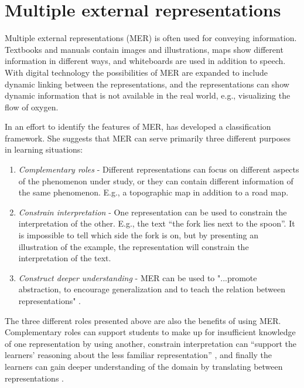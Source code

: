 
\section{Multiple external representations}
Multiple external representations (MER) is often used for conveying information. Textbooks and manuals contain images and illustrations, maps show different information in different ways, and whiteboards are used in addition to speech. With digital technology the possibilities of MER are expanded to include dynamic linking between the representations, and the representations can show dynamic information that is not available in the real world, e.g., visualizing the flow of oxygen. 

In an effort to identify the features of MER, \citet{ainsworth1999functions} has developed a classification framework. She suggests that MER can serve primarily three different purposes in learning situations:
\begin{enumerate}
\item{} \emph{Complementary roles} - Different representations can focus on different aspects of the phenomenon under study, or they can contain different information of the same phenomenon. E.g., a topographic map in addition to a road map. 
\item{} \emph{Constrain interpretation} - One representation can be used to constrain the interpretation of the other. E.g., the text “the fork lies next to the spoon”. It is impossible to tell which side the fork is on, but by presenting an illustration of the example, the representation will constrain the interpretation of the text. 
\item{} \emph{Construct deeper understanding} - MER can be used to "...promote abstraction, to encourage generalization and to teach the relation between representations" \citep[p. 141]{ainsworth1999functions}. 
\end{enumerate}

The three different roles presented above are also the benefits of using MER. Complementary roles can support students to make up for insufficient knowledge of one representation by using another, constrain interpretation can “support the learners’ reasoning about the less familiar representation” \citet{ainsworth1999functions}, and finally the learners can gain deeper understanding of the domain by translating between representations \citep{van2006supporting}. 

